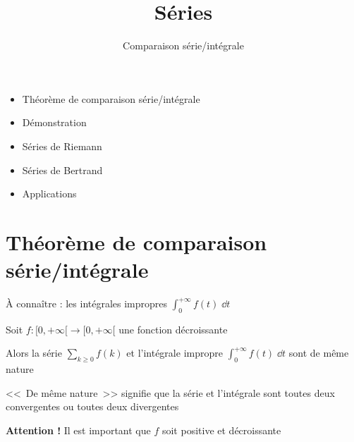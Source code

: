 

   





\title{{\bf Séries}}
\subtitle{Comparaison série/intégrale}

\begin{frame}
  
  \debutmontitre

  \pause

{\footnotesize
\hfill
{}
\begin{minipage}{0.6\textwidth}
  \begin{itemize}
    \item<3-> Théorème de comparaison série/intégrale
    \item<4-> Démonstration
    \item<5-> Séries de Riemann
    \item<6-> Séries de Bertrand
    \item<7-> Applications
  \end{itemize}
\end{minipage}
}

\end{frame}

\setcounter{framenumber}{0}



\section{Théorème de comparaison série/intégrale}

\begin{frame}
\`A connaître : les intégrales impropres $\int_0^{+\infty} f(t) \;\dd t$

\pause
\medskip

\begin{theoreme}
Soit $f : [0,+\infty[ \to [0,+\infty[$ une fonction décroissante

\pause
Alors la série $\displaystyle\sum_{k \ge 0} f(k)$ et l'intégrale impropre $\displaystyle\int_0^{+\infty} f(t) \; \dd t$ sont de même nature
\end{theoreme}

\pause
\medskip
<<~De même nature~>> signifie que la série et l'intégrale sont toutes deux convergentes ou toutes deux divergentes

\pause
\medskip
\textbf{Attention !} Il est important que $f$ soit positive et décroissante
\end{frame}



